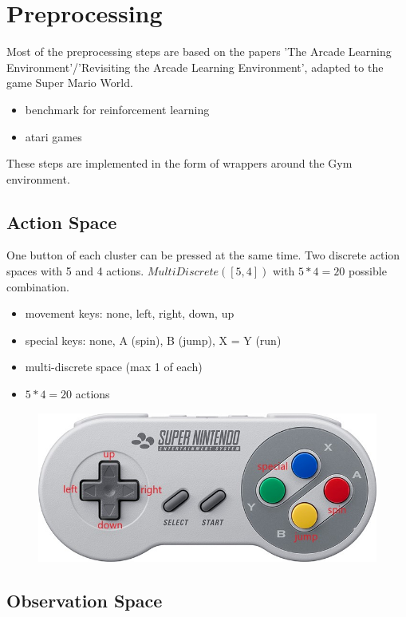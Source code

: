 \documentclass{article}
\begin{document}
    \section{Preprocessing}
    Most of the preprocessing steps are based on the papers 'The Arcade Learning Environment'/'Revisiting the Arcade Learning Environment', adapted to the game Super Mario World.
    \begin{itemize}
        \item benchmark for reinforcement learning
        \item atari games
    \end{itemize}
    These steps are implemented in the form of wrappers around the Gym environment.
    \subsection{Action Space}
    One button of each cluster can be pressed at the same time.
    Two discrete action spaces with 5 and 4 actions.
    $MultiDiscrete([5,4])$ with $5*4=20$ possible combination.
    \begin{itemize}
        \item movement keys: none, left, right, down, up
        \item special keys: none, A (spin), B (jump), X = Y (run)
        \item multi-discrete space (max 1 of each)
        \item $5*4=20$ actions
    \end{itemize}
    \begin{figure}[H]
        \centering
        \includegraphics[width=.85\textwidth]{snes-controller-annot}
    \end{figure}
    \subsection{Observation Space}
\end{document}
